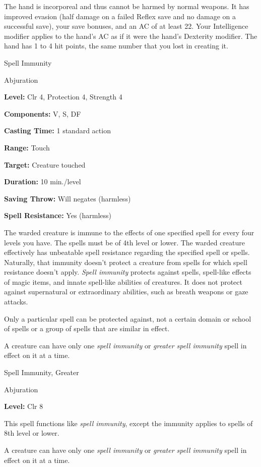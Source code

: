 \documentclass{article}
\begin{document}
The hand is incorporeal and thus cannot be harmed by normal weapons. It has improved 
evasion (half damage on a failed Reflex save and no damage on a successful save), 
your save bonuses, and an AC of at least 22. Your Intelligence modifier applies 
to the hand's AC as if it were the hand's Dexterity modifier. The hand has 1 to 
4 hit points, the same number that you lost in creating it.

\vspace{12pt}
Spell Immunity

Abjuration

\textbf{Level:} Clr 4, Protection 4, Strength 4

\textbf{Components:} V, S, DF

\textbf{Casting Time:} 1 standard action

\textbf{Range:} Touch

\textbf{Target:} Creature touched

\textbf{Duration:} 10 min./level

\textbf{Saving Throw: }Will negates (harmless)

\textbf{Spell Resistance:} Yes (harmless)

The warded creature is immune to the effects of one specified spell for every four 
levels you have. The spells must be of 4th level or lower. The warded creature 
effectively has unbeatable spell resistance regarding the specified spell or spells. 
Naturally, that immunity doesn't protect a creature from spells for which spell 
resistance doesn't apply. \textit{Spell immunity }protects against spells, spell-like 
effects of magic items, and innate spell-like abilities of creatures. It does not 
protect against supernatural or extraordinary abilities, such as breath weapons 
or gaze attacks.

Only a particular spell can be protected against, not a certain domain or school 
of spells or a group of spells that are similar in effect. 

A creature can have only one \textit{spell immunity }or \textit{greater spell immunity 
}spell in effect on it at a time.

\vspace{12pt}
Spell Immunity, Greater

Abjuration

\textbf{Level:} Clr 8

This spell functions like \textit{spell immunity}, except the immunity applies 
to spells of 8th level or lower.

A creature can have only one \textit{spell immunity }or \textit{greater spell immunity 
}spell in effect on it at a time.
\end{document}
